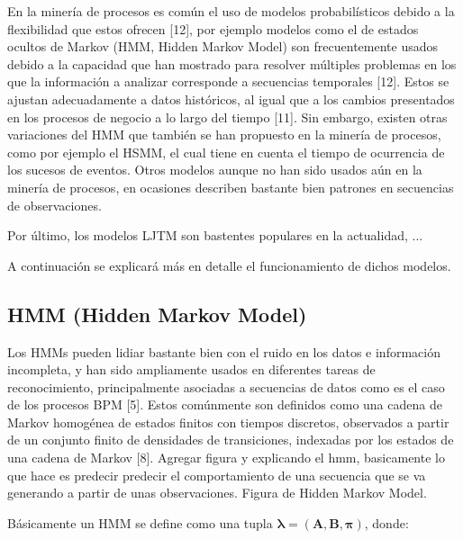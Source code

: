 En la minería de procesos es común el uso de modelos probabilísticos debido a la flexibilidad que estos ofrecen [12], por ejemplo modelos como el de estados ocultos de Markov (HMM, Hidden Markov Model) son frecuentemente usados debido a la capacidad que han mostrado para resolver múltiples problemas en los que la información a analizar corresponde a secuencias temporales [12]. Estos se ajustan adecuadamente a datos históricos, al igual que a los cambios presentados en los procesos de negocio a lo largo del tiempo [11]. Sin embargo, existen otras variaciones del HMM que también se han propuesto en la minería de procesos, como por ejemplo el HSMM, el cual tiene en cuenta el tiempo de ocurrencia de los sucesos de eventos. Otros modelos aunque no han sido usados aún en la minería de procesos, en ocasiones describen bastante bien patrones en secuencias de observaciones. 

Por último, los modelos LJTM son bastentes populares en la actualidad, ...

A continuación se explicará más en detalle el funcionamiento de dichos modelos.

\subsection{HMM (Hidden Markov Model) }

Los HMMs pueden lidiar bastante bien con el ruido en los datos e información incompleta, y han sido ampliamente usados en diferentes tareas de reconocimiento, principalmente asociadas a secuencias de datos como es el caso de los procesos BPM [5]. Estos comúnmente son  definidos como una cadena de Markov homogénea de estados finitos con tiempos discretos, observados a partir de un conjunto finito de densidades de transiciones, indexadas por los estados de una cadena de Markov [8]. Agregar figura y explicando el hmm, basicamente lo que hace es predecir predecir el comportamiento de una secuencia que se va generando a partir de unas observaciones.
Figura de Hidden Markov Model.


Básicamente un HMM se define como una tupla $\boldsymbol\lambda = ( \textbf{A} , \textbf{B} , \boldsymbol\pi )$, donde:


